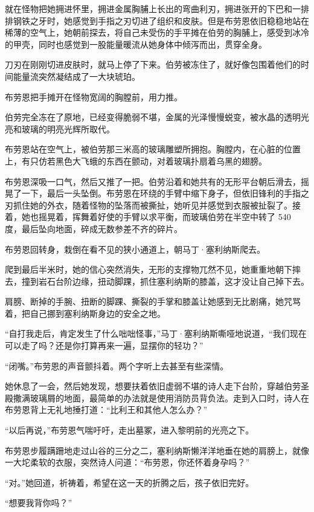 \documentclass[AutoFakeBold=true]{book}
\begin{document}
就在怪物把她拥进怀里，拥进金属胸脯上长出的弯曲利刃，拥进张开的下巴和一排排钢铁之牙时，她感觉到手指之刃切进了组织和皮肤。但是布劳恩依旧稳稳地站在稀薄的空气上，她朝前探去，将自己未受伤的手平摊在伯劳的胸脯上，感受到冰冷的甲壳，同时也感觉到一股能量暖流从她身体中倾泻而出，贯穿全身。

刀刃在刚刚切进皮肤时，就马上停了下来。伯劳被冻住了，就好像包围着他们的时间能量流突然凝结成了一大块琥珀。

布劳恩把手摊开在怪物宽阔的胸膛前，用力推。

伯劳完全冻在了原地，已经变得脆弱不堪，金属的光泽慢慢蜕变，被水晶的透明光亮和玻璃的明亮光辉所取代。

布劳恩站在空气上，被伯劳那三米高的玻璃雕塑所拥抱。胸膛内，在心脏的位置上，有只仿若黑色大飞蛾的东西在颤动，对着玻璃扑扇着乌黑的翅膀。

布劳恩深吸一口气，然后又推了一把。伯劳沿着和她共有的无形平台朝后滑去，摇晃了一下，最后一头坠倒。布劳恩在环绕的手臂中缩下身子，但依旧锋利的手指之刃抓住她的外衣，随着怪物的坠落而被撕扯，她听见并感觉到衣服被扯裂了。接着，她也摇晃着，挥舞着好使的手臂以求平衡，而玻璃伯劳在半空中转了 540 度，最后坠向地面，碎成无数参差不齐的碎片。

布劳恩回转身，栽倒在看不见的狭小通道上，朝马丁·塞利纳斯爬去。

爬到最后半米时，她的信心突然消失，无形的支撑物兀然不见，她重重地朝下摔去，撞到岩石台阶边缘，扭动脚踝，抓住塞利纳斯的膝盖，这才没让自己掉下去。

肩膀、断掉的手腕、扭断的脚踝、撕裂的手掌和膝盖让她感到无比剧痛，她咒骂着，把自己挪到塞利纳斯身边的安全之地。

``自打我走后，肯定发生了什么咄咄怪事，''马丁·塞利纳斯嘶哑地说道，``我们现在可以走了吗？还是你打算再来一遍，显摆你的轻功？''

``闭嘴。''布劳恩的声音颤抖着。两个字听上去甚至有些深情。

她休息了一会，然后她发现，想要扶着依旧虚弱不堪的诗人走下台阶，穿越伯劳圣殿撒满玻璃屑的地面，最简单的办法就是使用消防员背负法。走到入口时，诗人在布劳恩背上无礼地捶打道：``比利王和其他人怎么办？''

``以后再说，''布劳恩气喘吁吁，走出墓冢，进入黎明前的光亮之下。

布劳恩步履蹒跚地走过山谷的三分之二，塞利纳斯懒洋洋地垂在她的肩膀上，就像一大坨柔软的衣服，突然诗人问道：``布劳恩，你还怀着身孕吗？''

``对。''她回道，祈祷着，希望在这一天的折腾之后，孩子依旧完好。

``想要我背你吗？''
\end{document}
